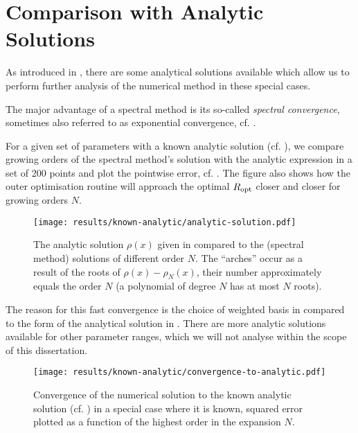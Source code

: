 \section{Comparison with Analytic Solutions}
As introduced in , there are some analytical solutions available which allow us to perform further analysis of the numerical method in these special cases.

The major advantage of a spectral method is its so-called \textit{spectral convergence}, sometimes also referred to as exponential convergence, cf. .


For a given set of parameters with a known analytic solution (cf. ), we compare growing orders of the spectral method's solution with the analytic expression in a set of 200 points and plot the pointwise error, cf. .
The figure also shows how the outer optimisation routine will approach the optimal $R_{\rm opt}$ closer and closer for growing orders $N$.

\begin{figure}[H]
  \centering
  \texttt{[image: results/known-analytic/analytic-solution.pdf]}
  \caption[Comparison with analytical solutions and error]{
    The analytic solution $\rho(x)$ given in  compared to the (spectral method) solutions of different order $N$.
    The ``arches'' occur as a result of the roots of $\rho(x) - \rho_N(x)$, their number approximately equals the order $N$ (a polynomial of degree $N$ has at most $N$ roots).
  }
  \label{fig:analytic-solution}
\end{figure}

The reason for this fast convergence is the choice of weighted basis in  compared to the form of the analytical solution in .
There are more analytic solutions available for other parameter ranges, which we will not analyse within the scope of this dissertation.

\begin{figure}[H]
  \centering
  \texttt{[image: results/known-analytic/convergence-to-analytic.pdf]}
  \caption[Convergence to analytic solution]{Convergence of the numerical solution to the known analytic solution (cf. ) in a special case where it is known, squared error plotted as a function of the highest order in the expansion $N$.}
  \label{fig:convergence-to-analytic}
\end{figure}
